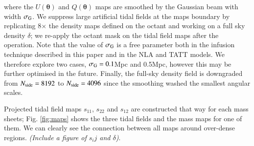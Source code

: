 \documentclass[useAMS,usenatbib]{mn2e}
\begin{document}
where the $U({\boldsymbol \theta})$ and $Q({\boldsymbol \theta})$ maps are smoothed by the Gaussian beam with width $\sigma_{\rm G}$. We suppress large artificial tidal fields at the maps boundary by replicating 8$\times$ the density maps defined on the octant and working on a full sky density $\delta$; we re-apply the octant mask on the tidal field maps after the operation. Note that the value of $\sigma_{\rm G}$ is a free parameter both in the infusion technique described in this paper and in the NLA and TATT models. We therefore explore two cases, $\sigma_{\rm G}=0.1$Mpc and 0.5Mpc, however this may be further optimised in the future. Finally, the full-sky density field is downgraded from $N_{\rm side}=8192$ to $N_{\rm side}=4096$ since the smoothing washed the smallest angular scales. 




Projected tidal field maps $s_{11}$, $s_{22}$ and $s_{12}$ are constructed that way for each mass sheets; Fig. \ref{fig:maps} shows the  three tidal fields and the mass maps for one of them. We can clearly see the connection between all maps around over-dense regions. {\it (Include a figure of $s_ij$ and $\delta$)}. 
\end{document}
